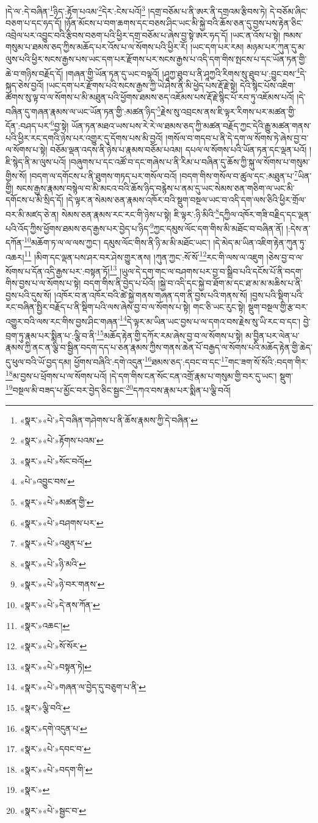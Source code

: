 །དེ་ལ་:དེ་བཞིན་\footnote{«སྣར་»«པེ་»དེ་བཞིན་གཤེགས་པ་ནི་ཆོས་རྣམས་ཀྱི་དེ་བཞིན་}ཉིད་:རྟོག་པའམ་\footnote{«སྣར་»«པེ་»རྟོགས་པའམ་}དེར་:ངེས་པའོ།\footnote{«སྣར་»«པེ་»སོང་བའོ།} །དགྲ་བཅོམ་པ་ནི་ཨར་ནི་དགྲའམ་རྩིབས་ཏེ། དེ་བཅོམ་ཞིང་བཅག་པ་དང་ཧད་དོ། །ཉོན་མོངས་པ་བག་ཆགས་དང་བཅས་ཤིང་ཡང་མི་སྐྱེ་བའི་ཆོས་ཅན་དུ་བྱས་པས་རྟེན་ཅིང་འབྲེལ་པར་འབྱུང་བའི་རྩིབས་བཅག་པའི་ཕྱིར་དགྲ་བཅོམ་པ་ཞེས་བྱ་སྟེ་ཨར་ཧད་དོ། །ཡང་ན་འོས་པ་སྟེ། ཁམས་གསུམ་པ་ཐམས་ཅད་ཀྱིས་མཆོད་པར་འོས་པ་ལ་སོགས་པའི་ཕྱིར་རོ། །ཡང་དག་པར་རམ། མཉམ་པར་ཀུན་དུ་མ་ལུས་པའི་ཕྱིར་སངས་རྒྱས་པས་ཡང་དག་པར་རྫོགས་པར་སངས་རྒྱས་པ་འདི་དག་གིས་སྤངས་པ་དང་ཡོན་ཏན་གྱི་ཆེ་བ་གཉིས་བརྗོད་དོ། །གཞན་གྱི་ཡོན་ཏན་དུ་ཡང་བལྟའོ། །ཤཱཀྱ་ཐུབ་པ་ནི་ཤཱཀྱའི་རིགས་སུ་ཐུབ་པ་:བྱུང་བས་\footnote{«པེ་»འབྱུང་བས་}དེ་སྐད་ཅེས་བྱའོ། །ཡང་དག་པར་རྫོགས་པའི་སངས་རྒྱས་ཀྱི་ཡེ་ཤེས་ནི་མི་ཕྱེད་པས་རྡོ་རྗེ་སྟེ། དེའི་སྙིང་པོས་འཇིག་ཚོགས་སུ་ལྟ་བ་ལ་སོགས་པ་མི་མཐུན་པའི་ཕྱོགས་ཐམས་ཅད་འཇོམས་པས་རྡོ་རྗེ་སྙིང་པོ་རབ་ཏུ་འཇོམས་པའོ། །དེ་བཞིན་དུ་གཞན་རྣམས་ལ་ཡང་ཡོན་ཏན་གྱི་:མཚན་ཉིད་\footnote{«སྣར་»«པེ་»མཚན་གྱི་}རྗེས་སུ་འབྲངས་ནས་ཇི་ལྟར་རིགས་པར་མཚན་གྱི་དོན་:བཤད་པར་\footnote{«སྣར་»«པེ་»བཤགས་པར་}བྱ་སྟེ། ཡོན་ཏན་མཐའ་ཡས་པས་རེ་རེ་ལ་ཐམས་ཅད་ཀྱི་མཚན་བརྗོད་ཀྱང་དེའི་རྒྱུ་མཚན་གནས་པའི་ཕྱིར་རང་དགའི་ཉེས་པར་འགྱུར་དུ་དོགས་པས་མི་བྱའོ། །གསོལ་བ་གདབ་པ་ནི་དེ་དག་ལ་སོགས་ཏེ་ཞེས་བྱ་བ་ལ་སོགས་པ་སྟེ། བཅོམ་ལྡན་འདས་ནི་ཉེས་པ་རྣམས་བཅོམ་པའམ། དཔལ་ལ་སོགས་པའི་ཡོན་ཏན་དང་ལྡན་པའོ། །ཇི་སྙེད་ནི་མ་ལུས་པའོ། །བཞུགས་པ་དང་འཚོ་བ་དང་གཞེས་པ་ནི་རིམ་པ་བཞིན་དུ་ཆོས་ཀྱི་སྐུ་ལ་སོགས་པ་གསུམ་གྱིས་སོ། །བདག་ལ་དགོངས་པ་ནི་ཐུགས་གཏད་པར་གསོལ་བའོ། །བདག་གིས་གསོལ་བ་ཚུལ་དང་:མཐུན་པ་\footnote{«སྣར་»«པེ་»འཐུན་པ་}ཡིན་གྱི། སངས་རྒྱས་རྣམས་བསྙེལ་བ་མི་མངའ་བའི་ཆོས་ཉིད་བརྙེས་པ་ནམ་དུ་ཡང་སེམས་ཅན་གཅིག་ལ་ཡང་མི་དགོངས་པ་མི་སྲིད་དོ། །དེ་ལྟར་ན་སེམས་ཅན་རྣམས་འཁོར་བའི་སྡུག་བསྔལ་ཡང་བ་འདི་དག་ལས་ཅིའི་ཕྱིར་གྲོལ་བར་མི་མཛད་ཅེ་ན། སེམས་ཅན་རྣམས་རང་རང་གི་ཉེས་པ་སྟེ། ཇི་ལྟར་:ཉི་མིའི་\footnote{«སྣར་»«པེ་»ཉི་མའི་}དཀྱིལ་འཁོར་གཟི་བརྗིད་དང་ལྡན་པའི་འོད་ཀྱིས་ཕྱོགས་ཐམས་ཅད་རྒྱས་པར་བྱེད་པ་ཉིད་\footnote{«སྣར་»«པེ་»ཉེ་བར་གནས་}ཀྱང་དམུས་ལོང་དག་གིས་མི་མཐོང་བ་བཞིན་ནོ། །:དེས་ན་དཀོན་\footnote{«སྣར་»«པེ་»དེ་ནས་ཀོན་}མཆོག་ཏ་ལ་ལ་ལས་ཀྱང་། དམུས་ལོང་གིས་ནི་ཉི་མ་མི་མཐོང་ཡང་། །དེ་མེད་མ་ཡིན་འཇིག་རྟེན་ཀུན་ཏུ་འཆར།\footnote{«སྣར་»འཆང་།} །མིག་དང་ལྡན་པས་ཤར་བར་ཤེས་གྱུར་ནས། །ཀུན་ཀྱང་:སོ་སོ་\footnote{«སྣར་»«པེ་»སོ་སོར་}རང་གི་ལས་ལ་འཇུག །ཅེས་བྱ་བ་ལ་སོགས་པ་དོན་འདི་རྒྱས་པར་:བསྟན་ཏོ།\footnote{«སྣར་»«པེ་»བསྟན་ཏེ།} །ཡུལ་དེ་དག་གང་ལ་བཤགས་པར་བྱ་བ་སྒྲིབ་པའི་དངོས་པོ་ནི་བདག་གིས་བྱས་པ་ལ་སོགས་པ་སྟེ། བདག་གིས་ནི་བྱེད་པ་པོའོ། །སྐྱེ་བ་འདི་དང་སྐྱེ་བ་ཐོག་མ་དང་ཐ་མ་མ་མཆིས་པ་ནི་བྱས་པའི་དུས་སོ། །འཁོར་བ་ན་འཁོར་བའི་ཚེ་སྐྱེ་གནས་གཞན་དག་ནི་བྱས་པའི་གནས་སོ། །བྱས་པའི་སྡིག་པའི་རང་བཞིན་སྤྱིར་བརྗོད་པ་ནི་སྡིག་པའི་ལས་ཞེས་བྱ་བ་ལ་སོགས་པ་སྟེ། གང་ཅི་ཡང་རུང་སྟེ། སྡུག་བསྔལ་གྱི་རྩ་བར་འགྱུར་བའི་ལས་རང་གིས་བྱས་ཤིང་གཞན་\footnote{«སྣར་»«པེ་»གཞན་ལ་བྱེད་དུ་བཅུག་པ་ནི་}དེ་ལྟར་མ་ཡིན་ཡང་བྱས་པ་ལ་དགའ་བས་རྗེས་སུ་ཡི་རང་བ་དང་། བྱེ་བྲག་ཏུ་རྣམ་པར་སྨིན་པ་:ལྕི་བ་ནི་\footnote{«སྣར་»ལྕི་བའི་}མཆོད་རྟེན་གྱི་དཀོར་རམ་ཞེས་བྱ་བ་ལ་སོགས་པ་སྟེ། མ་བྱིན་པར་ལེན་པ་རྣམས་ཀྱི་ནང་ན་ལྕི་བ་སྦྱིན་བདག་དད་པ་ཅན་རྣམས་ཀྱིས་གནས་ཆེན་པོ་བརྒྱད་ལ་སོགས་པའི་མཆོད་རྟེན་གྱི་ཆེད་དུ་ཕུལ་བའི་ཡོ་བྱད་དམ། ཕྱོགས་བཞིའི་:དགེ་འདུན་\footnote{«སྣར་»དགེ་འདུན་པ་}ཐམས་ཅད་:དབང་བ་དང་\footnote{«སྣར་»«པེ་»དབང་བ་}གང་ཟག་སོ་སོའི་:བདག་གིར་\footnote{«སྣར་»«པེ་»བདག་གི་}མ་བྱས་པ་ཕྲོགས་པ་ལ་སོགས་པའོ། །དེ་དག་གིས་ངན་སོང་ངན་འགྲོ་རྣམ་པ་གསུམ་གྱི་བར་དུ་ཡང་། སྡུག་\footnote{«སྣར་»}བསྔལ་མི་བཟད་པ་མྱོང་བར་བྱེད་ཅིང་སྦྱང་\footnote{«སྣར་»«པེ་»སྦྱང་བ་}དཀའ་བས་རྣམ་པར་སྨིན་པ་ལྕི་བའོ། 